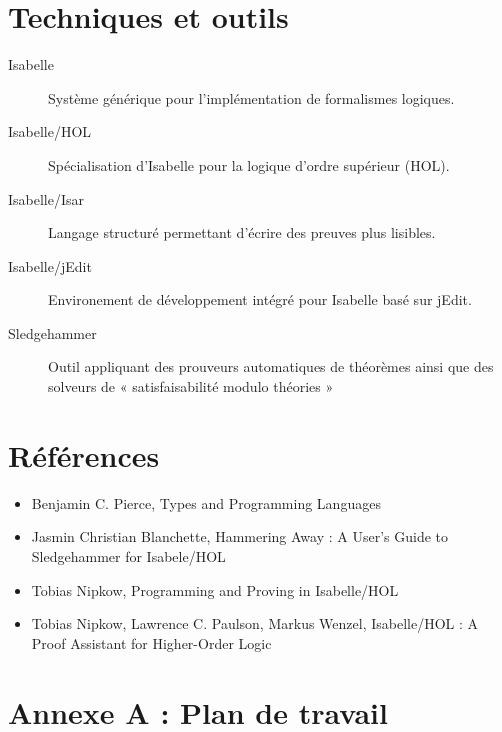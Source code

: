 \documentclass[a4paper, oneside, 12pt, titlepage, draft]{article}
\begin{document}
\section{Techniques et outils}

\begin{description}
  \item[Isabelle] Système générique pour l'implémentation de formalismes logiques.
  \item[Isabelle/HOL] Spécialisation d'Isabelle pour la logique d'ordre supérieur (\gls{HOL}).
  \item[Isabelle/Isar] Langage structuré permettant d'écrire des preuves plus lisibles.
  \item[Isabelle/jEdit] Environement de développement intégré pour Isabelle basé sur jEdit.
  \item[Sledgehammer] Outil appliquant des prouveurs automatiques de théorèmes ainsi que des
    solveurs de « satisfaisabilité modulo théories »
\end{description}

\section{Références}


\begin{itemize}
  \item Benjamin C. Pierce, Types and Programming Languages
  \item Jasmin Christian Blanchette, Hammering Away : A User's Guide to Sledgehammer for Isabele/HOL
  \item Tobias Nipkow, Programming and Proving in Isabelle/HOL
  \item Tobias Nipkow, Lawrence C. Paulson, Markus Wenzel, Isabelle/HOL : A Proof Assistant for
    Higher-Order Logic
\end{itemize}

\section{Annexe A : Plan de travail}

%
\end{document}
